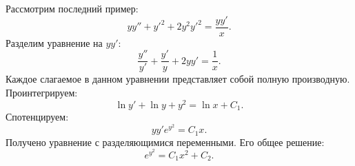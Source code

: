 		Рассмотрим последний пример:
		\[ yy'' + y'^2 + 2y^2 y'^2 = \frac{yy'}{x}. \]
		Разделим уравнение на $yy'$:
		\[ \frac{y''}{y'} + \frac{y'}{y} + 2yy' = \frac{1}{x}. \]
		Каждое слагаемое в данном уравнении представляет собой полную производную. Проинтегрируем:
		\[ \ln{y'} + \ln{y} + y^2 = \ln{x} + C_1. \]
		Спотенцируем:
		\[ yy' e^{y^2} = C_1 x. \]
		Получено уравнение с разделяющимися переменными. Его общее решение:
		\[ e^{y^2} = C_1 x^2 + C_2. \]
